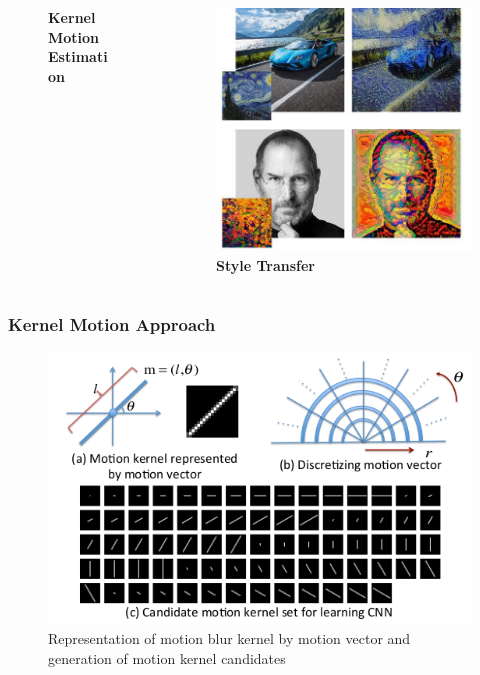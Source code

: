 \documentclass [handout] {beamer}
\begin{document}
\begin{frame}
\begin{columns}
\begin{column}{0.4\textwidth}
\begin{figure}
		\tiny{\caption{\textbf{Kernel Motion Estimation}}}
	\end{figure}
	\end{column}
	\begin{column}{0.4\textwidth}
	\begin{figure}
		\centering
		\includegraphics[width=\columnwidth]{style_transfer_example.png} 
		\tiny{\caption{\textbf{Style Transfer}}}
	\end{figure}
	\end{column}
	\end{columns}
\end{frame}


\begin{frame}
	\frametitle{Kernel Motion Approach}
	\begin{figure}[hptb]
	\centering
	\includegraphics[scale=0.7]{motion_kernel.png} 
	\caption{Representation of motion blur kernel by motion vector
	and generation of motion kernel candidates}
	\label{motion_kernel}
	\end{figure}
\end{frame}
\end{document}
